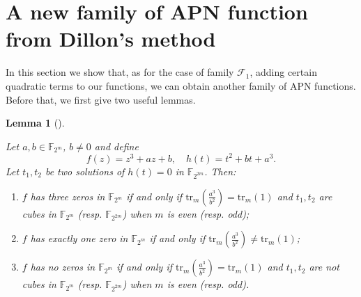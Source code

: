 \documentclass{article}
\newtheorem{lemma}{Lemma}
\def\fm{{\mathbb F}_{2^m}}
\newcommand{\tr}{\mathrm{tr}}
\begin{document}
\section{A new family of APN function from Dillon's method}

In this section we  show that, as for the case of family $\mathcal{F}_1$, adding certain quadratic terms to our functions, we can obtain another family of APN functions. { Before that, we first give two useful lemmas. }

{	\begin{lemma}[\cite{williams1975note}]	\label{cubic}
	
	Let  $a,b\in\fm$, $b\neq0$ and define 
	$$f(z)=z^3+az+b,\quad h(t)=t^2+bt+a^3.$$ 
	Let $t_1, t_2$ be two solutions of $h(t)=0$ in $\mathbb{F}_{2^{2m}}$. Then: 
	\begin{enumerate}[(1)]
		\item $f$ has three zeros in $\fm$ if and only if $\tr_m\left(\frac{a^3}{b^2}\right)=\tr_m(1)$ and $t_1, t_2$ are cubes in $\fm$ (resp. $\mathbb{F}_{2^{2m}}$) when $m$ is even (resp. odd);
		\item $f$ has exactly one zero in $\fm$ if and only if $\tr_m\left(\frac{a^3}{b^2}\right)\neq\tr_m(1)$;
		\item $f$ has no zeros in $\fm$ if and only if $\tr_m\left(\frac{a^3}{b^2}\right)=\tr_m(1)$ and $t_1, t_2$ are not cubes in $\fm$ (resp. $\mathbb{F}_{2^{2m}}$) when $m$ is even (resp. odd).
	\end{enumerate}
\end{lemma}} 
\end{document}
